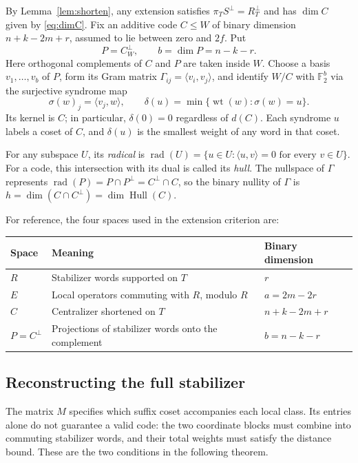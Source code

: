 \documentclass[11pt]{article}
\theoremstyle{definition}
\theoremstyle{remark}
\newcommand{\F}{\mathbb F_2}
\newcommand{\wt}{\operatorname{wt}}
\newcommand{\rad}{\operatorname{rad}}
\newcommand{\Hull}{\operatorname{Hull}}
\begin{document}
By Lemma~\ref{lem:shorten}, any extension satisfies
\(\pi_T S^\perp=R_T^\perp\) and has \(\dim C\) given by \eqref{eq:dimC}.
Fix an additive code \(C\leq W\) of binary dimension \(n+k-2m+r\),
assumed to lie between zero and \(2f\). Put
\[
 P=C^\perp_W,\qquad b=\dim P=n-k-r.
\]
Here orthogonal complements of \(C\) and \(P\) are taken inside \(W\).
Choose a basis \(v_1,\ldots,v_b\) of \(P\), form its Gram matrix
\(\Gamma_{ij}=\langle v_i,v_j\rangle\), and identify \(W/C\) with
\(\F^b\) via the surjective syndrome map
\[
 \sigma(w)_j=\langle v_j,w\rangle,\qquad
 \delta(u)=\min\{\wt(w):\sigma(w)=u\}.
\]
Its kernel is \(C\); in particular, \(\delta(0)=0\) regardless of
\(d(C)\). Each syndrome \(u\) labels a coset of \(C\), and \(\delta(u)\)
is the smallest weight of any word in that coset.

For any subspace \(U\), its \emph{radical} is
\(\rad(U)=\{u\in U:\langle u,v\rangle=0\text{ for every }v\in U\}\). For
a code, this intersection with its dual is called its \emph{hull}. The
nullspace of \(\Gamma\) represents \(\rad(P)=P\cap P^\perp
=C^\perp\cap C\), so the binary nullity of \(\Gamma\) is
\(h=\dim(C\cap C^\perp)=\dim\Hull(C)\).

For reference, the four spaces used in the extension criterion are:
\begin{center}\small
\begin{tabularx}{\linewidth}{@{}lXl@{}}\toprule
Space&Meaning&Binary dimension\\\midrule
\(R\)&Stabilizer words supported on \(T\)&\(r\)\\
\(E\)&Local operators commuting with \(R\), modulo \(R\)&\(a=2m-2r\)\\
\(C\)&Centralizer shortened on \(T\)&\(n+k-2m+r\)\\
\(P=C^\perp\)&Projections of stabilizer words onto the complement&\(b=n-k-r\)\\\bottomrule
\end{tabularx}
\end{center}

\subsection{Reconstructing the full stabilizer}

The matrix \(M\) specifies which suffix coset accompanies each local
class. Its entries alone do not guarantee a valid code: the two
coordinate blocks must combine into commuting stabilizer words, and
their total weights must satisfy the distance bound. These are the two
conditions in the following theorem.
\end{document}
